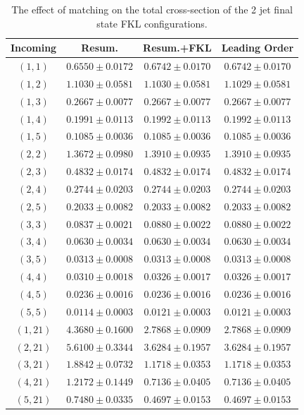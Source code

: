 	\begin{table}[hbt]
	\centering
	\caption{The effect of matching on the total cross-section of the 2 jet final state FKL configurations.}
	\label{tab:matching1}
	\begin{tabular}{c|c|c|c}
	Incoming & Resum. & Resum.+FKL & Leading Order \\ \hline
	$(1,  1)$       &  $0.6550 \pm 0.0172$  &  $0.6742 \pm 0.0170$  & $0.6742 \pm 0.0170$ \\
	$(1,  2)$       &  $1.1030 \pm 0.0581$  &  $1.1030 \pm 0.0581$  & $1.1029 \pm 0.0581$ \\
	$(1,  3)$       &  $0.2667 \pm 0.0077$  &  $0.2667 \pm 0.0077$  & $0.2667 \pm 0.0077$ \\
	$(1,  4)$       &  $0.1991 \pm 0.0113$  &  $0.1992 \pm 0.0113$  & $0.1992 \pm 0.0113$ \\
	$(1,  5)$       &  $0.1085 \pm 0.0036$  &  $0.1085 \pm 0.0036$  & $0.1085 \pm 0.0036$ \\
	$(2,  2)$       &  $1.3672 \pm 0.0980$  &  $1.3910 \pm 0.0935$  & $1.3910 \pm 0.0935$ \\
	$(2,  3)$       &  $0.4832 \pm 0.0174$  &  $0.4832 \pm 0.0174$  & $0.4832 \pm 0.0174$ \\
	$(2,  4)$       &  $0.2744 \pm 0.0203$  &  $0.2744 \pm 0.0203$  & $0.2744 \pm 0.0203$ \\
	$(2,  5)$       &  $0.2033 \pm 0.0082$  &  $0.2033 \pm 0.0082$  & $0.2033 \pm 0.0082$ \\
	$(3,  3)$       &  $0.0837 \pm 0.0021$  &  $0.0880 \pm 0.0022$  & $0.0880 \pm 0.0022$ \\
	$(3,  4)$       &  $0.0630 \pm 0.0034$  &  $0.0630 \pm 0.0034$  & $0.0630 \pm 0.0034$ \\
	$(3,  5)$       &  $0.0313 \pm 0.0008$  &  $0.0313 \pm 0.0008$  & $0.0313 \pm 0.0008$ \\
	$(4,  4)$       &  $0.0310 \pm 0.0018$  &  $0.0326 \pm 0.0017$  & $0.0326 \pm 0.0017$ \\
	$(4,  5)$       &  $0.0236 \pm 0.0016$  &  $0.0236 \pm 0.0016$  & $0.0236 \pm 0.0016$ \\
	$(5,  5)$       &  $0.0114 \pm 0.0003$  &  $0.0121 \pm 0.0003$  & $0.0121 \pm 0.0003$ \\
	$(1, 21)$       &  $4.3680 \pm 0.1600$  &  $2.7868 \pm 0.0909$  & $2.7868 \pm 0.0909$ \\
	$(2, 21)$       &  $5.6100 \pm 0.3344$  &  $3.6284 \pm 0.1957$  & $3.6284 \pm 0.1957$ \\
	$(3, 21)$       &  $1.8842 \pm 0.0732$  &  $1.1718 \pm 0.0353$  & $1.1718 \pm 0.0353$ \\
	$(4, 21)$       &  $1.2172 \pm 0.1449$  &  $0.7136 \pm 0.0405$  & $0.7136 \pm 0.0405$ \\
	$(5, 21)$       &  $0.7480 \pm 0.0335$  &  $0.4697 \pm 0.0153$  & $0.4697 \pm 0.0153$ \\ \hline
	\end{tabular}
	\end{table}

